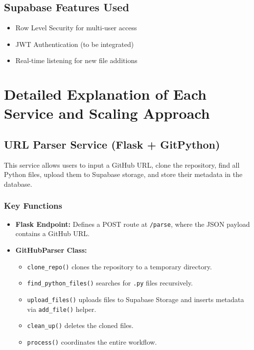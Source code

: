 \documentclass{article}
\begin{document}
\subsection{Supabase Features Used}
\begin{itemize}
    \item Row Level Security for multi-user access
    \item JWT Authentication (to be integrated)
    \item Real-time listening for new file additions
\end{itemize}

\section{Detailed Explanation of Each Service and Scaling Approach}

\subsection{URL Parser Service (Flask + GitPython)}
This service allows users to input a GitHub URL, clone the repository, find all Python files, upload them to Supabase storage, and store their metadata in the database.

\subsubsection{Key Functions}
\begin{itemize}
    \item \textbf{Flask Endpoint:} Defines a POST route at \texttt{/parse}, where the JSON payload contains a GitHub URL.
    \item \textbf{GitHubParser Class:}
    \begin{itemize}
        \item \texttt{clone\_repo()} clones the repository to a temporary directory.
        \item \texttt{find\_python\_files()} searches for \texttt{.py} files recursively.
        \item \texttt{upload\_files()} uploads files to Supabase Storage and inserts metadata via \texttt{add\_file()} helper.
        \item \texttt{clean\_up()} deletes the cloned files.
        \item \texttt{process()} coordinates the entire workflow.
    \end{itemize}
\end{itemize}
\end{document}

